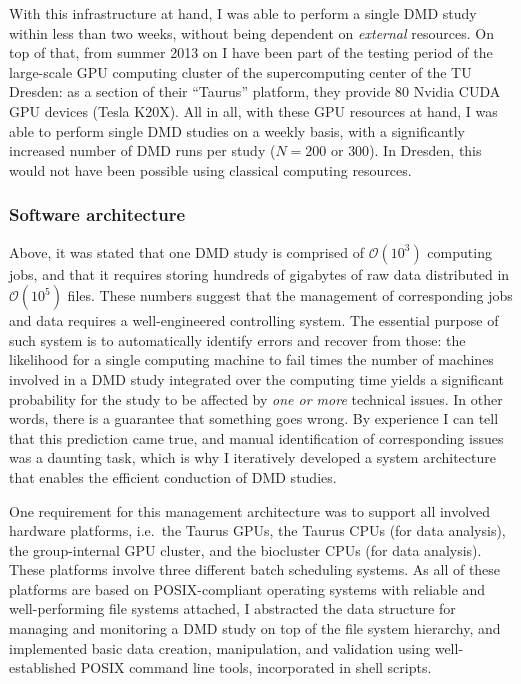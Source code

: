 With this infrastructure at hand, I was able to perform a single DMD study
within less than two weeks, without being dependent on \textit{external}
resources. On top of that, from summer 2013 on I have been part of the testing
period of the large-scale GPU computing cluster of the supercomputing center of
the TU Dresden: as a section of their \enquote{Taurus} platform, they provide 80
Nvidia CUDA GPU devices (Tesla K20X). All in all, with these GPU resources at
hand, I was able to perform single DMD studies on a weekly basis, with a
significantly increased number of DMD runs per study ($N=200$ or $300$). In
Dresden, this would not have been possible using classical computing resources.


\subsubsection{Software architecture}

Above, it was stated that one DMD study is comprised of $\mathcal{O}(10^3)$
computing jobs, and that it requires storing hundreds of gigabytes of raw data
distributed in $\mathcal{O}(10^5)$ files. These numbers suggest that the
management of corresponding jobs and data requires a well-engineered controlling
system. The essential purpose of such system is to automatically identify errors
and recover from those: the likelihood for a single computing machine to fail
times the number of machines involved in a DMD study integrated over the
computing time yields a significant probability for the study to be affected by
\textit{one or more} technical issues. In other words, there is a guarantee that
something goes wrong. By experience I can tell that this prediction came true,
and manual identification of corresponding issues was a daunting task, which is
why I iteratively developed a system architecture that enables the efficient
conduction of DMD studies.

One requirement for this management architecture was to support all involved
hardware platforms, i.e.\ the Taurus GPUs, the Taurus CPUs (for data analysis),
the group-internal GPU cluster, and the biocluster CPUs (for data analysis).
These platforms involve three different batch scheduling systems. As all of
these platforms are based on POSIX-compliant operating systems with reliable and
well-performing file systems attached, I abstracted the data structure for
managing and monitoring a DMD study on top of the file system hierarchy, and
implemented basic data creation, manipulation, and validation using
well-established POSIX command line tools, incorporated in shell scripts.

